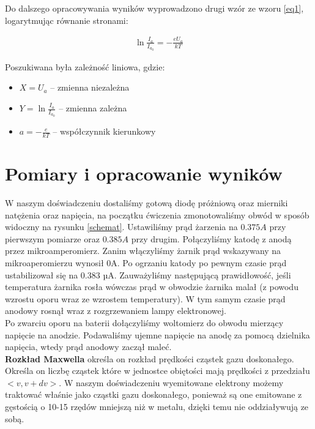 \documentclass[a4paper]{article}
\newlength{\du}
\begin{document}
Do dalszego opracowywania wyników wyprowadzono drugi wzór ze wzoru \ref{eq1}, logarytmując równanie
stronami:

\begin{align}
	\ln{\frac{I_a}{I_{a_0}}} = -\frac{e U_a}{k T}
\label{eq2}
\end{align}

Poszukiwana była zależność liniowa, gdzie:
\begin{itemize}
\item $X = U_a$ -- zmienna niezależna
\item $Y = \ln \frac{I_a}{I_{a_0}}$ -- zmienna zależna
\item $a = -\frac{e}{kT}$ -- współczynnik kierunkowy
\end{itemize}





\section{Pomiary i opracowanie wyników}
W naszym doświadczeniu dostaliśmy gotową diodę próżniową oraz mierniki natężenia oraz napięcia, na początku ćwiczenia zmonotowaliśmy obwód w sposób widoczny na rysunku \ref{schemat}. Ustawiliśmy prąd żarzenia na $0.375 A$ przy pierwszym pomiarze oraz $0.385 A$ przy drugim. Połączyliśmy katodę z anodą przez mikroamperomierz. Zanim włączyliśmy żarnik prąd wskazywany na mikroaperomierzu wynosił 0A. Po ogrzaniu katody po pewnym czasie prąd ustabilizował się na 0.383 µA. Zauważyliśmy następującą prawidłowość, jeśli temperatura żarnika rosła wówczas prąd w obwodzie żarnika malał (z powodu wzrostu oporu wraz ze wzrostem temperatury). W tym samym czasie prąd anodowy rosnął wraz z rozgrzewaniem lampy elektronowej.\\
Po zwarciu oporu na baterii dołączyliśmy woltomierz do obwodu mierzący napięcie na anodzie. Podawaliśmy ujemne napięcie na anodę za pomocą dzielnika napięcia, wtedy prąd anodowy zaczął maleć.
\\ \textbf{Rozkład Maxwella} określa on rozkład prędkości cząstek gazu doskonałego. Określa on liczbę cząstek które w jednostce obiętości mają prędkości z przedziału $<v, v + dv>$. W naszym doświadczeniu wyemitowane elektrony możemy traktować właśnie jako cząstki gazu doskonałego, ponieważ są one emitowane z gęstością o 10-15 rzędów mniejszą niż w metalu, dzięki temu nie oddziaływują ze sobą. 
\end{document}
